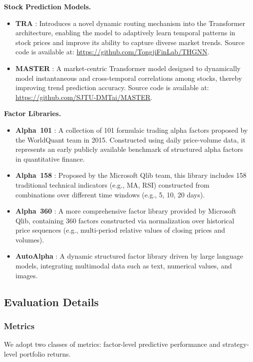 \documentclass{article}
\begin{document}
\textbf{ Stock Prediction Models.}
\begin{itemize}[leftmargin=4ex]
    \item \textbf{TRA} \cite{lin2021learning}: Introduces a novel dynamic routing mechanism into the Transformer architecture, enabling the model to adaptively learn temporal patterns in stock prices and improve its ability to capture diverse market trends. Source code is available at: \url{https://github.com/TongjiFinLab/THGNN}.
    \item \textbf{MASTER} \cite{li2024master}: A market-centric Transformer model designed to dynamically model instantaneous and cross-temporal correlations among stocks, thereby improving trend prediction accuracy. Source code is available at: \url{https://github.com/SJTU-DMTai/MASTER}.
\end{itemize}

\textbf{Factor Libraries.}
\begin{itemize}[leftmargin=4ex]
    \item \textbf{Alpha~101} \cite{kakushadze2016101formulaicalphas}: A collection of 101 formulaic trading alpha factors proposed by the WorldQuant team in 2015. Constructed using daily price-volume data, it represents an early publicly available benchmark of structured alpha factors in quantitative finance.
    \item \textbf{Alpha~158} \cite{alpha158}: Proposed by the Microsoft Qlib team, this library includes 158 traditional technical indicators (e.g., MA, RSI) constructed from combinations over different time windows (e.g., 5, 10, 20 days).
    \item \textbf{Alpha~360} \cite{alpha360}: A more comprehensive factor library provided by Microsoft Qlib, containing 360 factors constructed via normalization over historical price sequences (e.g., multi-period relative values of closing prices and volumes).
    \item \textbf{AutoAlpha} \cite{kou2024automate}: A dynamic structured factor library driven by large language models, integrating multimodal data such as text, numerical values, and images.
\end{itemize}





\subsection{Evaluation Details} \label{app:evaluation}
\subsubsection{Metrics}
We adopt two classes of metrics: factor-level predictive performance and strategy-level portfolio returns.
\end{document}
